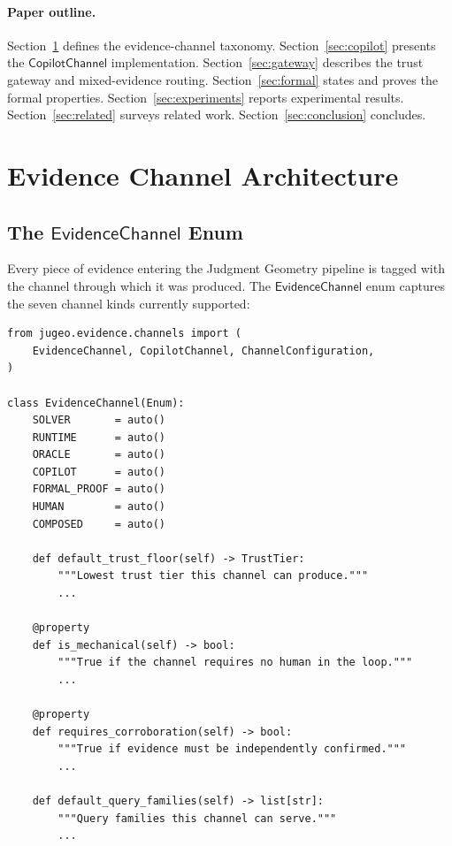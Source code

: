 \documentclass[11pt]{article}
\newcommand{\CopCh}{\mathsf{CopilotChannel}}
\newcommand{\EvCh}{\mathsf{EvidenceChannel}}
\begin{document}
\paragraph{Paper outline.}
Section~\ref{sec:arch} defines the evidence-channel taxonomy.
Section~\ref{sec:copilot} presents the $\CopCh$ implementation.
Section~\ref{sec:gateway} describes the trust gateway and
mixed-evidence routing.
Section~\ref{sec:formal} states and proves the formal properties.
Section~\ref{sec:experiments} reports experimental results.
Section~\ref{sec:related} surveys related work.
Section~\ref{sec:conclusion} concludes.

\section{Evidence Channel Architecture}
\label{sec:arch}

\subsection{The \texorpdfstring{$\EvCh$}{EvidenceChannel} Enum}
\label{sec:arch:enum}

Every piece of evidence entering the Judgment Geometry pipeline is
tagged with the channel through which it was produced.  The
$\EvCh$ enum captures the seven channel kinds currently supported:

\begin{lstlisting}[style=jugeo-python,caption={The \texttt{EvidenceChannel} enum.},label=lst:evidencechannel]
from jugeo.evidence.channels import (
    EvidenceChannel, CopilotChannel, ChannelConfiguration,
)

class EvidenceChannel(Enum):
    SOLVER       = auto()
    RUNTIME      = auto()
    ORACLE       = auto()
    COPILOT      = auto()
    FORMAL_PROOF = auto()
    HUMAN        = auto()
    COMPOSED     = auto()

    def default_trust_floor(self) -> TrustTier:
        """Lowest trust tier this channel can produce."""
        ...

    @property
    def is_mechanical(self) -> bool:
        """True if the channel requires no human in the loop."""
        ...

    @property
    def requires_corroboration(self) -> bool:
        """True if evidence must be independently confirmed."""
        ...

    def default_query_families(self) -> list[str]:
        """Query families this channel can serve."""
        ...
\end{lstlisting}
\end{document}
